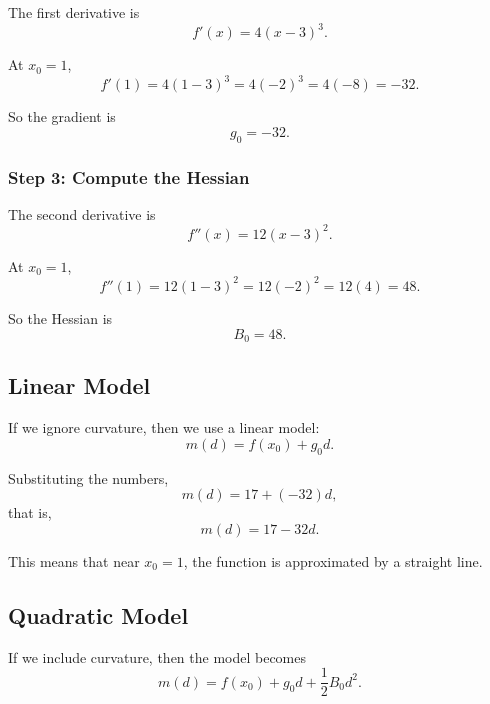 \documentclass{article}
\begin{document}
The first derivative is
\begin{equation}
f'(x) = 4(x-3)^3.
\end{equation}

At $x_0 = 1$,
\begin{equation}
f'(1) = 4(1-3)^3 = 4(-2)^3 = 4(-8) = -32.
\end{equation}

So the gradient is
\begin{equation}
g_0 = -32.
\end{equation}

\subsubsection{Step 3: Compute the Hessian}

The second derivative is
\begin{equation}
f''(x) = 12(x-3)^2.
\end{equation}

At $x_0 = 1$,
\begin{equation}
f''(1) = 12(1-3)^2 = 12(-2)^2 = 12(4) = 48.
\end{equation}

So the Hessian is
\begin{equation}
B_0 = 48.
\end{equation}

\subsection{Linear Model}

If we ignore curvature, then we use a linear model:
\begin{equation}
m(d) = f(x_0) + g_0 d.
\end{equation}

Substituting the numbers,
\begin{equation}
m(d) = 17 + (-32)d,
\end{equation}
that is,
\begin{equation}
m(d) = 17 - 32d.
\end{equation}

This means that near $x_0=1$, the function is approximated by a straight line.

\subsection{Quadratic Model}

If we include curvature, then the model becomes
\begin{equation}
m(d) = f(x_0) + g_0 d + \frac{1}{2} B_0 d^2.
\end{equation}
\end{document}
